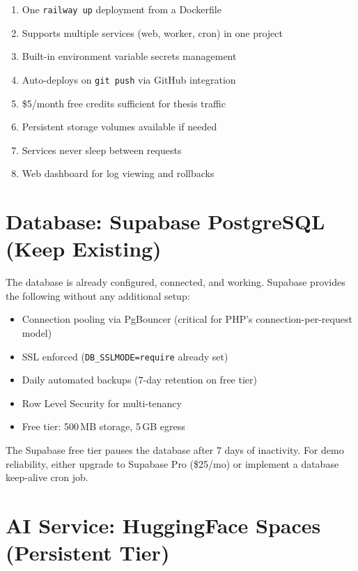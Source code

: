 \documentclass[12pt,a4paper]{report}
\begin{document}
\begin{enumerate}[leftmargin=1.5em]
    \item One \texttt{railway up} deployment from a Dockerfile
    \item Supports multiple services (web, worker, cron) in one project
    \item Built-in environment variable secrets management
    \item Auto-deploys on \texttt{git push} via GitHub integration
    \item \$5/month free credits sufficient for thesis traffic
    \item Persistent storage volumes available if needed
    \item Services never sleep between requests
    \item Web dashboard for log viewing and rollbacks
\end{enumerate}

\section{Database: Supabase PostgreSQL (Keep Existing)}

The database is already configured, connected, and working. Supabase
provides the following without any additional setup:

\begin{itemize}[leftmargin=1.5em]
    \item Connection pooling via PgBouncer (critical for PHP's
          connection-per-request model)
    \item SSL enforced (\texttt{DB\_SSLMODE=require} already set)
    \item Daily automated backups (7-day retention on free tier)
    \item Row Level Security for multi-tenancy
    \item Free tier: 500\,MB storage, 5\,GB egress
\end{itemize}

\begin{warningbox}
    The Supabase free tier pauses the database after 7 days of
    inactivity. For demo reliability, either upgrade to Supabase Pro
    (\$25/mo) or implement a database keep-alive cron job.
\end{warningbox}

\section{AI Service: HuggingFace Spaces (Persistent Tier)}
\end{document}
